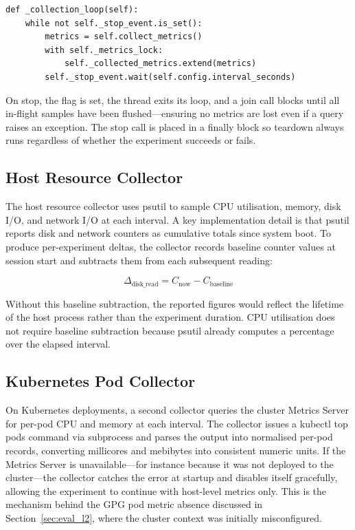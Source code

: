 \documentclass{l4proj}
\begin{document}
\begin{lstlisting}[style=pythonstyle, caption={The background collection loop inside MonitoringSession.}, label={lst:monitoring}]
def _collection_loop(self):
    while not self._stop_event.is_set():
        metrics = self.collect_metrics()
        with self._metrics_lock:
            self._collected_metrics.extend(metrics)
        self._stop_event.wait(self.config.interval_seconds)
\end{lstlisting}

On stop, the flag is set, the thread exits its loop, and a join call blocks until all in-flight samples have been flushed---ensuring no metrics are lost even if a query raises an exception. The stop call is placed in a finally block so teardown always runs regardless of whether the experiment succeeds or fails.

\subsection{Host Resource Collector}
\label{sec:impl_host_collector}

The host resource collector uses psutil to sample CPU utilisation, memory, disk I/O, and network I/O at each interval. A key implementation detail is that psutil reports disk and network counters as cumulative totals since system boot. To produce per-experiment deltas, the collector records baseline counter values at session start and subtracts them from each subsequent reading:

\[
\Delta_{\text{disk\_read}} = C_{\text{now}} - C_{\text{baseline}}
\]

Without this baseline subtraction, the reported figures would reflect the lifetime of the host process rather than the experiment duration. CPU utilisation does not require baseline subtraction because psutil already computes a percentage over the elapsed interval.

\subsection{Kubernetes Pod Collector}
\label{sec:impl_pod_collector}

On Kubernetes deployments, a second collector queries the cluster Metrics Server for per-pod CPU and memory at each interval. The collector issues a kubectl top pods command via subprocess and parses the output into normalised per-pod records, converting millicores and mebibytes into consistent numeric units. If the Metrics Server is unavailable---for instance because it was not deployed to the cluster---the collector catches the error at startup and disables itself gracefully, allowing the experiment to continue with host-level metrics only. This is the mechanism behind the GPG pod metric absence discussed in Section~\ref{sec:eval_l2}, where the cluster context was initially misconfigured.
\end{document}
